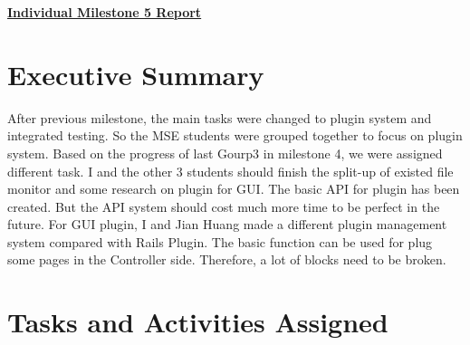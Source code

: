 \documentclass{article}
\begin{document}
\pagestyle{headings}

\begin{center}
{\LARGE\textbf{\underline{{Individual Milestone 5 Report}}}}
\end{center}

\section*{Executive Summary}

After previous milestone, the main tasks were changed to plugin system and integrated testing. So the MSE students were grouped together to focus on plugin system. Based on the progress of last Gourp3 in milestone 4, we were assigned different task. I and the other 3 students should finish the split-up of existed file monitor and some research on plugin for GUI. The basic API for plugin has been created. But the API system should cost much more time to be perfect in the future. For GUI plugin, I and Jian Huang made a different plugin management system compared with Rails Plugin. The basic function can be used for plug some pages in the Controller side. Therefore, a lot of blocks need to be broken.

\section*{Tasks and Activities Assigned}
\end{document}
